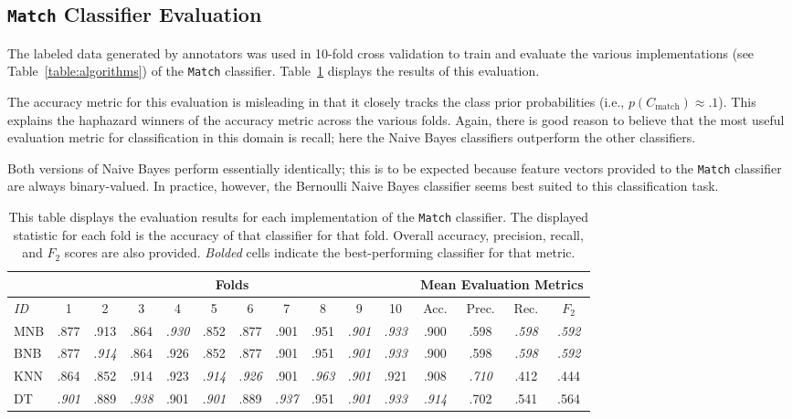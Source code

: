 \subsection {{\tt Match} Classifier Evaluation}

The labeled data generated by annotators was used in 10-fold cross validation to train and evaluate the various implementations (see Table~\ref{table:algorithms}) of the {\tt Match} classifier.  Table~\ref{table:matcheval} displays the results of this evaluation.

The accuracy metric for this evaluation is misleading in that it closely tracks the class prior probabilities (i.e., $p(C_{\text{match}}) \approx .1$).  This explains the haphazard winners of the accuracy metric across the various folds.  Again, there is good reason to believe that the most useful evaluation metric for classification in this domain is recall; here the Naive Bayes classifiers outperform the other classifiers.

Both versions of Naive Bayes perform essentially identically; this is to be expected because feature vectors provided to the {\tt Match} classifier are always binary-valued.  In practice, however, the Bernoulli Naive Bayes classifier seems best suited to this classification task.  

\begin{table}[htb]
    \caption[{\tt Match} classifier evaluation]{
	This table displays the evaluation results for each implementation of the {\tt Match} classifier.  The displayed statistic for each fold is the accuracy of that classifier for that fold.  Overall accuracy, precision, recall, and $F_2$ scores are also provided.  {\em Bolded} cells indicate the best-performing classifier for that metric.
	}
		\small
		\tabcolsep 4.5pt
    \begin{center}
    \begin{tabular}{@{}|l|*{10}{c|}|*{4}{c|}@{}}
    \hline
    & \multicolumn{10}{c||}{Folds} & \multicolumn{4}{|c|}{Mean Evaluation Metrics} \\
		\hline
		{\em ID} & 1 & 2 & 3 & 4 & 5 & 6 & 7 & 8 & 9 & 10 & Acc. & Prec. & Rec. & $F_2$ \\ \hline \hline
		MNB & .877 & .913 & .864 & {\em .930} & .852 & .877 & .901 & .951 & {\em .901} & {\em .933} & .900 & .598 & {\em .598} & {\em .592} \\ \hline
		BNB & .877 & {\em .914} & .864 & .926 & .852 & .877 & .901 & .951 & {\em .901} & {\em .933} & .900 & .598 & {\em .598} & {\em .592} \\ \hline
		KNN & .864 & .852 & .914 & .923 & {\em .914} & {\em .926} & .901 & {\em .963} & {\em .901} & .921 & .908 & {\em .710} & .412 & .444 \\ \hline
		DT & {\em .901} & .889 & {\em .938} & .901 & {\em .901} & .889 & {\em .937} & .951 & {\em .901} & {\em .933} & {\em .914} & .702 & .541 & .564 \\ \hline
		\end{tabular}
   \\ \rule{0mm}{5mm}
	\end{center}
	 \label{table:matcheval}
\end{table}

